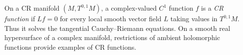 
On a CR manifold $(M,T^{0,1}M)$, a complex-valued $C^1$ function $f$ is a \emph{CR function} if $Lf=0$ for every local smooth vector field $L$ taking values in $T^{0,1}M$. Thus it solves the tangential Cauchy--Riemann equations. On a smooth real hypersurface of a complex manifold, restrictions of ambient holomorphic functions provide examples of CR functions.
